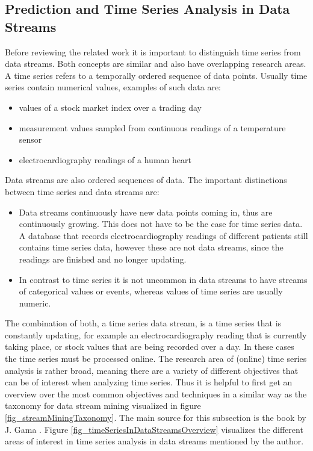\subsection{Prediction and Time Series Analysis in Data Streams}
\label{subsec_timeSeriesAnalysis}

Before reviewing the related work it is important to distinguish time series from data streams. Both concepts are similar and also have overlapping research areas. A time series refers to a temporally ordered sequence of data points. Usually time series contain numerical values, examples of such data are:

\begin{itemize}
	\item values of a stock market index over a trading day
	\item measurement values sampled from continuous readings of a temperature sensor
	\item electrocardiography readings of a human heart
\end{itemize}

Data streams are also ordered sequences of data. The important distinctions between time series and data streams are: 

\begin{itemize}
	\item Data streams continuously have new data points coming in, thus are continuously growing. This does not have to be the case for time series data. A database that records electrocardiography readings of different patients still contains time series data, however these are not data streams, since the readings are finished and no longer updating.
	\item In contrast to time series it is not uncommon in data streams to have streams of categorical values or events, whereas values of time series are usually numeric.
\end{itemize}


The combination of both, a time series data stream, is a time series that is constantly updating, for example an electrocardiography reading that is currently taking place, or stock values that are being recorded over a day. In these cases the time series must be processed online. \newline
The research area of (online) time series analysis is rather broad, meaning there are a variety of different objectives that can be of interest when analyzing time series. Thus it is helpful to first get an overview over the most common objectives and techniques in a similar way as the taxonomy for data stream mining visualized in figure \ref{fig_streamMiningTaxonomy}. The main source for this subsection is the book by J. Gama \cite{gama2010knowledge}. Figure \ref{fig_timeSeriesInDataStreamsOverview} visualizes the different areas of interest in time series analysis in data streams mentioned by the author.

